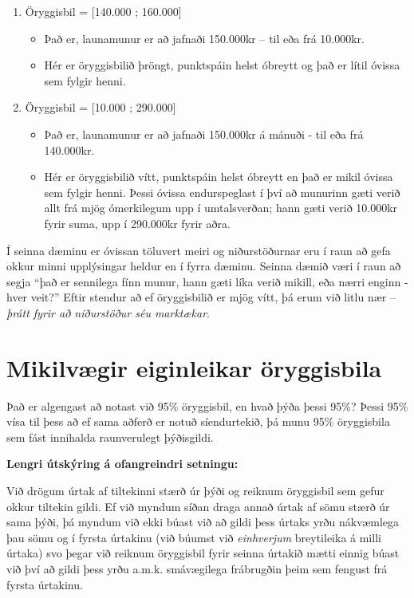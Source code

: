 \documentclass[
]{book}
\providecommand{\tightlist}{%
  \setlength{\itemsep}{0pt}\setlength{\parskip}{0pt}}
\begin{document}
\begin{enumerate}
\def\labelenumi{\arabic{enumi}.}
\tightlist
\item
  Öryggisbil = {[}140.000 ; 160.000{]}

  \begin{itemize}
  \item
    Það er, launamunur er að jafnaði 150.000kr -- til eða frá 10.000kr.
  \item
    Hér er öryggisbilið þröngt, punktspáin helst óbreytt og það er lítil óvissa sem fylgir henni.
  \end{itemize}
\item
  Öryggisbil = {[}10.000 ; 290.000{]}

  \begin{itemize}
  \item
    Það er, launamunur er að jafnaði 150.000kr á mánuði - til eða frá 140.000kr.
  \item
    Hér er öryggisbilið vítt, punktspáin helst óbreytt en það er mikil óvissa sem fylgir henni. Þessi óvissa endurspeglast í því að munurinn gæti verið allt frá mjög ómerkilegum upp í umtalsverðan; hann gæti verið 10.000kr fyrir suma, upp í 290.000kr fyrir aðra.
  \end{itemize}
\end{enumerate}

Í seinna dæminu er óvissan töluvert meiri og niðurstöðurnar eru í raun að gefa okkur minni upplýsingar heldur en í fyrra dæminu. Seinna dæmið væri í raun að segja ``það er sennilega fínn munur, hann gæti líka verið mikill, eða nærri enginn - hver veit?'' Eftir stendur að ef öryggisbilið er mjög vítt, þá erum við litlu nær -- \emph{þrátt fyrir að niðurstöður séu marktækar}.

\hypertarget{mikilvuxe6gir-eiginleikar-uxf6ryggisbila}{%
\section{Mikilvægir eiginleikar öryggisbila}\label{mikilvuxe6gir-eiginleikar-uxf6ryggisbila}}

Það er algengast að notast við 95\% öryggisbil, en hvað þýða þessi 95\%? Þessi 95\% vísa til þess að ef sama aðferð er notuð síendurtekið, þá munu 95\% öryggisbila sem fást innihalda raunverulegt þýðisgildi.

\textbf{Lengri útskýring á ofangreindri setningu:}

Við drögum úrtak af tiltekinni stærð úr þýði og reiknum öryggisbil sem gefur okkur tiltekin gildi. Ef við myndum síðan draga annað úrtak af sömu stærð úr sama þýði, þá myndum við ekki búast við að gildi þess úrtaks yrðu nákvæmlega þau sömu og í fyrsta úrtakinu (við búumst við \emph{einhverjum} breytileika á milli úrtaka) svo þegar við reiknum öryggisbil fyrir seinna úrtakið mætti einnig búast við því að gildi þess yrðu a.m.k. smávægilega frábrugðin þeim sem fengust frá fyrsta úrtakinu.
\end{document}
